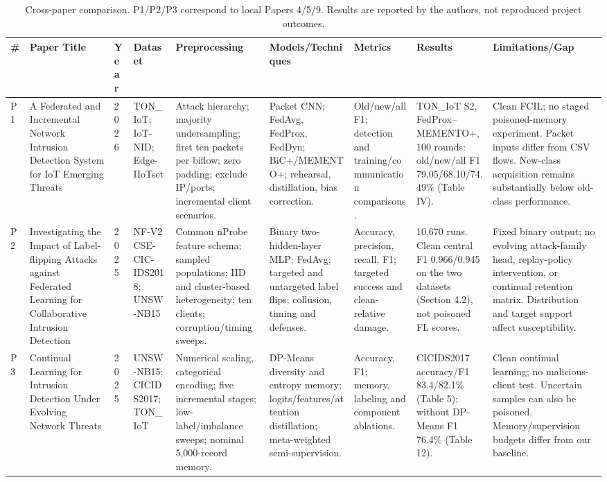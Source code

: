 \documentclass[10pt,a4paper]{article}
\begin{document}
\begin{landscape}
\begin{table}[p]
\centering\footnotesize
\caption{Cross-paper comparison. P1/P2/P3 correspond to local Papers 4/5/9. Results are reported by the authors, not reproduced project outcomes.}
\label{tab:comparison}
\begin{tabular}{L{0.5cm}L{3.1cm}L{0.8cm}L{2.1cm}L{3.0cm}L{3.3cm}L{2.0cm}L{3.0cm}L{4.0cm}}
\toprule
\# & Paper Title & Year & Dataset & Preprocessing & Models/Techniques & Metrics & Results & Limitations/Gap\\
\midrule
P1 & A Federated and Incremental Network Intrusion Detection System for IoT Emerging Threats \cite{carillo}
& 2026 & TON\_IoT; IoT-NID; Edge-IIoTset
& Attack hierarchy; majority undersampling; first ten packets per biflow; zero padding; exclude IP/ports; incremental client scenarios.
& Packet CNN; FedAvg, FedProx, FedDyn; BiC+/MEMENTO+; rehearsal, distillation, bias correction.
& Old/new/all F1; detection and training/communication comparisons.
& TON\_IoT S2, FedProx--MEMENTO+, 100 rounds: old/new/all F1 79.05/68.10/74.49\% (Table IV).
& Clean FCIL; no staged poisoned-memory experiment. Packet inputs differ from CSV flows. New-class acquisition remains substantially below old-class performance.\\[5pt]
P2 & Investigating the Impact of Label-flipping Attacks against Federated Learning for Collaborative Intrusion Detection \cite{lavaur}
& 2025 & NF-V2 CSE-CIC-IDS2018; UNSW-NB15
& Common nProbe feature schema; sampled populations; IID and cluster-based heterogeneity; ten clients; corruption/timing sweeps.
& Binary two-hidden-layer MLP; FedAvg; targeted and untargeted label flips; collusion, timing and defenses.
& Accuracy, precision, recall, F1; targeted success and clean-relative damage.
& 10,670 runs. Clean central F1 0.966/0.945 on the two datasets (Section 4.2), not poisoned FL scores.
& Fixed binary output; no evolving attack-family head, replay-policy intervention, or continual retention matrix. Distribution and target support affect susceptibility.\\[5pt]
P3 & Continual Learning for Intrusion Detection Under Evolving Network Threats \cite{guo}
& 2025 & UNSW-NB15; CICIDS2017; TON\_IoT
& Numerical scaling, categorical encoding; five incremental stages; low-label/imbalance sweeps; nominal 5,000-record memory.
& DP-Means diversity and entropy memory; logits/features/attention distillation; meta-weighted semi-supervision.
& Accuracy, F1; memory, labeling and component ablations.
& CICIDS2017 accuracy/F1 83.4/82.1\% (Table 5); without DP-Means F1 76.4\% (Table 12).
& Clean continual learning; no malicious-client test. Uncertain samples can also be poisoned. Memory/supervision budgets differ from our baseline.\\
\bottomrule
\end{tabular}
\end{table}
\end{landscape}
\end{document}
